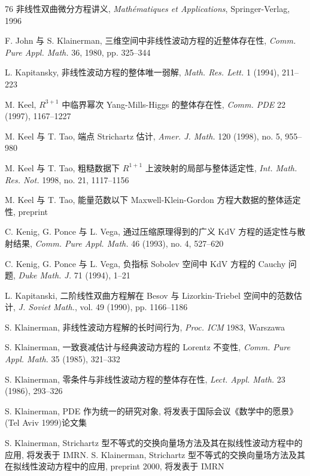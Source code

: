 \begin{mybibliography}{76}
 非线性双曲微分方程讲义,  \emph{Mathématiques et Applications},  Springer-Verlag,  1996

 F. John 与 S. Klainerman,  三维空间中非线性波动方程的近整体存在性,  \emph{Comm. Pure Appl. Math.} 36,  1980,  pp. 325--344

 L. Kapitansky,  非线性波动方程的整体唯一弱解,  \emph{Math. Res. Lett.} 1 (1994),  211--223

 M. Keel,  $R^{3+1}$ 中临界幂次 Yang-Mills-Higgs 的整体存在性,  \emph{Comm. PDE} 22 (1997),  1167--1227

 M. Keel 与 T. Tao,  端点 Strichartz 估计,  \emph{Amer. J. Math.} 120 (1998),  no. 5,  955--980

 M. Keel 与 T. Tao,  粗糙数据下 $R^{1+1}$ 上波映射的局部与整体适定性,  \emph{Int. Math. Res. Not.} 1998,  no. 21,  1117--1156

 M. Keel 与 T. Tao,  能量范数以下 Maxwell-Klein-Gordon 方程大数据的整体适定性,  preprint

 C. Kenig,  G. Ponce 与 L. Vega,  通过压缩原理得到的广义 KdV 方程的适定性与散射结果,  \emph{Comm. Pure Appl. Math.} 46 (1993),  no. 4,  527--620

 C. Kenig,  G. Ponce 与 L. Vega,  负指标 Sobolev 空间中 KdV 方程的 Cauchy 问题,  \emph{Duke Math. J.} 71 (1994),  1--21

 L. Kapitanski,  二阶线性双曲方程解在 Besov 与 Lizorkin-Triebel 空间中的范数估计,  \emph{J. Soviet Math.},  vol. 49 (1990),  pp. 1166--1186

 S. Klainerman,  非线性波动方程解的长时间行为,  \emph{Proc. ICM} 1983,  Warszawa

 S. Klainerman,  一致衰减估计与经典波动方程的 Lorentz 不变性,  \emph{Comm. Pure Appl. Math.} 35 (1985),  321--332

 S. Klainerman,  零条件与非线性波动方程的整体存在性,  \emph{Lect. Appl. Math.} 23 (1986),  293--326

 S. Klainerman,  PDE 作为统一的研究对象,  将发表于国际会议《数学中的愿景》(Tel Aviv 1999)论文集

 S. Klainerman,  Strichartz 型不等式的交换向量场方法及其在拟线性波动方程中的应用,  将发表于 IMRN. S. Klainerman,  Strichartz 型不等式的交换向量场方法及其在拟线性波动方程中的应用,  preprint 2000,  将发表于 IMRN


\end{mybibliography}
